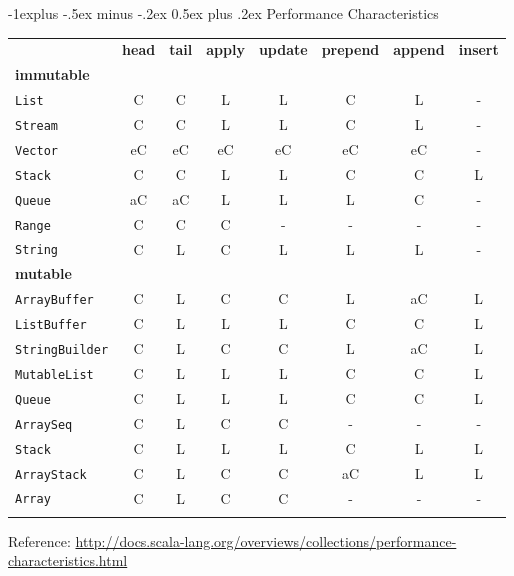 \documentclass[a4paper,twoside,10pt,landscape]{article}
\makeatletter
\renewcommand{\subsection}{\@startsection{subsection}{2}{0mm}%
                                {-1explus -.5ex minus -.2ex}%
                                {0.5ex plus .2ex}%
                                {\normalfont\normalsize\bfseries}}
\makeatother
\begin{document}
\begin{multicols}{3}
\subsection{Performance Characteristics}
\begingroup
\setlength{\tabcolsep}{1pt}
\begin{center}
\begin{tabular}{@{}lccccccc@{}}
\hline\noalign{\smallskip}
 & \textbf{head} & \textbf{tail} & \textbf{apply} & \textbf{update} & \textbf{prepend} & \textbf{append} & \textbf{insert}\\
\noalign{\smallskip}\hline\noalign{\smallskip}
\textbf{immutable} &&&&&&& \\	
\texttt{List} & C & C & L & L & C & L & - \\
\texttt{Stream} & C & C & L & L & C & L & - \\
\texttt{Vector} & eC & eC & eC & eC & eC & eC & - \\
\texttt{Stack} & C & C & L & L & C & C & L \\
\texttt{Queue} & aC & aC & L & L & L & C & - \\
\texttt{Range} & C & C & C & - & - & - & - \\
\texttt{String} & C & L & C & L & L & L & - \\
\textbf{mutable} &&&&&&& \\				
\texttt{ArrayBuffer} & C & L & C & C & L & aC & L \\
\texttt{ListBuffer} & C & L & L & L & C & C & L \\
\texttt{StringBuilder} & C & L & C & C & L & aC & L \\
\texttt{MutableList} & C & L & L & L & C & C & L \\
\texttt{Queue} & C & L & L & L & C & C & L \\
\texttt{ArraySeq} & C & L & C & C & - & - & - \\
\texttt{Stack} & C & L & L & L & C & L & L \\
\texttt{ArrayStack} & C & L & C & C & aC & L & L \\
\texttt{Array} & C & L & C & C & - & - & - \\
\noalign{\smallskip}\hline
\end{tabular}
\raggedright{\tiny{Reference: \url{http://docs.scala-lang.org/overviews/collections/performance-characteristics.html}}}
\end{center}
\endgroup


\end{multicols}
\end{document}

